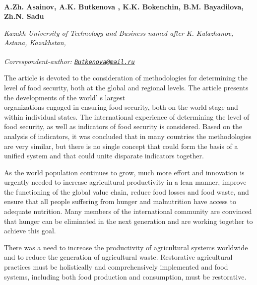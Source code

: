 
\begin{articleheader}

{\bfseries  
A.Zh. Asainov\authorid,
A.K. Butkenova\textsuperscript{\envelope } \authorid,
K.K. Bokenchin\authorid,
B.M. Bayadilova\authorid,
Zh.N. Sadu\authorid}
\end{articleheader}

\begin{affiliation}
\emph{Kazakh University of Technology and Business named after K. Kulazhanov, Astana, Kazakhstan,}

\raggedright \textsuperscript{\envelope }{\em Correspondent-author: \href{mailto:Butkenova@mail.ru}{\nolinkurl{Butkenova@mail.ru}}}
\end{affiliation}

The article is devoted to the consideration of methodologies for
determining the level of food security, both at the global and regional
levels. The article presents the developments of the
world' s largest \\organizations engaged in ensuring food
security, both on the world stage and within individual states. The
international experience of determining the level of food security, as
well as indicators of food security is considered. Based on the analysis
of indicators, it was concluded that in many countries the methodologies
are very similar, but there is no single concept that could form the
basis of a unified system and that could unite disparate indicators
together.

As the world population continues to grow, much more effort and
innovation is urgently needed to increase agricultural productivity in a
lean manner, improve the functioning of the global value chain, reduce
food losses and food waste, and ensure that all people suffering from
hunger and malnutrition have access to adequate nutrition. Many members
of the international community are convinced that hunger can be
eliminated in the next generation and are working together to achieve
this goal.

There was a need to increase the productivity of agricultural systems
worldwide and to reduce the generation of agricultural waste.
Restorative agricultural practices must be holistically and
comprehensively implemented and food systems, including both food
production and consumption, must be restorative.

